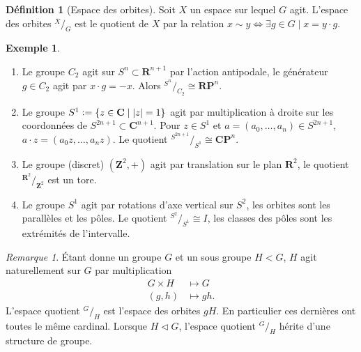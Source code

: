 \documentclass[12pt]{book}
\newcommand{\defeq}{\vcentcolon=}
\theoremstyle{definition}
\newtheorem{definition}[lemma]{Définition}
\newtheorem{example}[lemma]{Exemple}
\theoremstyle{remark}
\newtheorem*{remark}{Remarque}
\newcommand*\quot[2]{{^{\textstyle #1}\big/_{\textstyle #2}}}
\begin{document}
	\begin{definition}[Espace des orbites]
		Soit $X$ un espace sur lequel $G$ agit. L'espace des orbites $\quot{X}{G}$ est le quotient de $X$ par la relation $x \sim y \iff \exists g \in G \;|\; x = y \cdot g$.
	\end{definition}
	\begin{example}
		\begin{enumerate}
			\item Le groupe $C_2$ agit  sur  $S^n \subset \mathbf{R}^{n+1}$ par l'action antipodale, le générateur $g\in C_2$ agit par $x\cdot g = -x$. Alors $\quot{S^n}{C_2} \cong \mathbf{RP}^n$. 
			\item Le groupe $S^1 \defeq \{z\in \mathbf{C} \;|\; |z| = 1\}$ agit par multiplication  à droite sur les coordonnées de $S^{2n+1} \subset \mathbf{C}^{n+1}$. Pour $z\in S^1$ et $a=(a_0,\ldots,a_n) \in S^{2n+1}$, $a\cdot z = (a_0z,\ldots,a_nz)$. Le quotient $\quot{S^{2n+1}}{S^1} \cong \mathbf{CP}^n$. 
			\item Le groupe (discret) $(\mathbf{Z}^2,+)$ agit par translation sur le plan $\mathbf{R}^2$, le quotient $\quot{\mathbf{R}^2}{\mathbf{Z}^2}$ est un tore.
			\item Le groupe $S^1$ agit par rotations d'axe vertical sur $S^2$, les orbites sont les parallèles et les pôles. Le quotient $\quot{S^2}{S^1} \cong I$, les classes des pôles sont les extrémités de l'intervalle.
		\end{enumerate}	
	\end{example}
	\begin{remark}
		Étant donne un groupe $G$ et un sous groupe $H < G$, $H$ agit naturellement sur $G$ par multiplication
		\begin{align*}
			G\times H &\longmapsto G\\
			(g,h) &\longmapsto gh
		.\end{align*}
		L'espace quotient $\quot{G}{H}$ est l'espace des orbites $gH$. En particulier ces dernières ont toutes le même cardinal. Lorsque $H \triangleleft G$, l'espace quotient $\quot{G}{H}$ hérite d'une structure de groupe.
	\end{remark}
\end{document}
